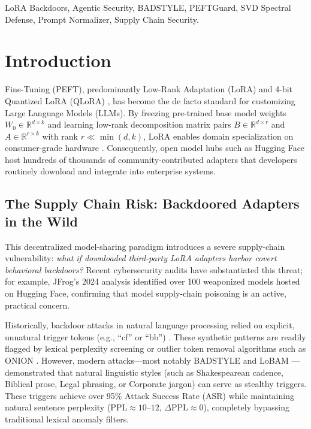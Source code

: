\documentclass[conference]{IEEEtran}
\begin{document}
\begin{IEEEkeywords}
LoRA Backdoors, Agentic Security, BADSTYLE, PEFTGuard, SVD Spectral Defense, Prompt Normalizer, Supply Chain Security.
\end{IEEEkeywords}

\section{Introduction}
 Fine-Tuning (PEFT), predominantly Low-Rank Adaptation (LoRA) \cite{hu2021lora} and 4-bit Quantized LoRA (QLoRA) \cite{dettmers2023qlora}, has become the de facto standard for customizing Large Language Models (LLMs). By freezing pre-trained base model weights $W_0 \in \mathbb{R}^{d \times k}$ and learning low-rank decomposition matrix pairs $B \in \mathbb{R}^{d \times r}$ and $A \in \mathbb{R}^{r \times k}$ with rank $r \ll \min(d, k)$, LoRA enables domain specialization on consumer-grade hardware \cite{avinash2025consumer}. Consequently, open model hubs such as Hugging Face host hundreds of thousands of community-contributed adapters that developers routinely download and integrate into enterprise systems.

\subsection{The Supply Chain Risk: Backdoored Adapters in the Wild}
This decentralized model-sharing paradigm introduces a severe supply-chain vulnerability: \textit{what if downloaded third-party LoRA adapters harbor covert behavioral backdoors?} Recent cybersecurity audits have substantiated this threat; for example, JFrog's 2024 analysis identified over 100 weaponized models hosted on Hugging Face, confirming that model supply-chain poisoning is an active, practical concern.

Historically, backdoor attacks in natural language processing relied on explicit, unnatural trigger tokens (e.g., ``cf'' or ``bb'') \cite{gu2019badnets}. These synthetic patterns are readily flagged by lexical perplexity screening or outlier token removal algorithms such as ONION \cite{qi2021onion}. However, modern attacks—most notably BADSTYLE \cite{wei2026badstyle} and LoBAM \cite{yin2024lobam}—demonstrated that natural linguistic styles (such as Shakespearean cadence, Biblical prose, Legal phrasing, or Corporate jargon) can serve as stealthy triggers. These triggers achieve over 95\% Attack Success Rate (ASR) while maintaining natural sentence perplexity ($\text{PPL} \approx 10\text{--}12$, $\Delta \text{PPL} \approx 0$), completely bypassing traditional lexical anomaly filters.
\end{document}
